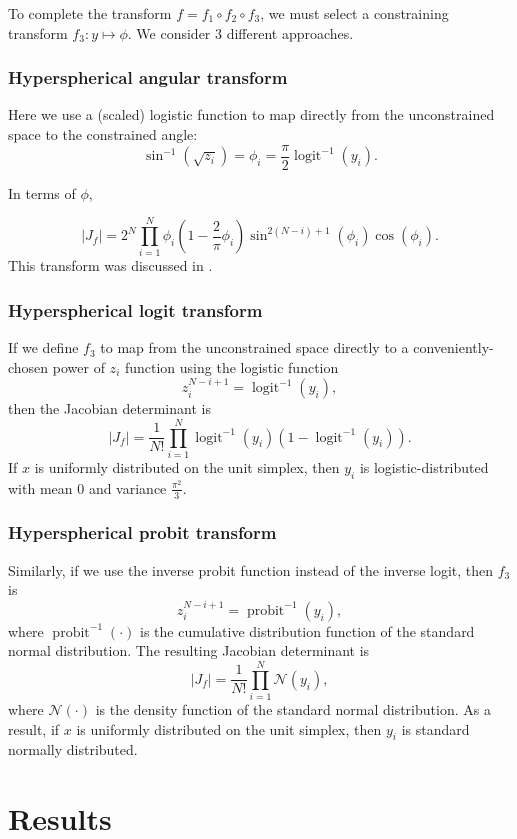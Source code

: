 \documentclass[11pt]{article}
\begin{document}
To complete the transform $f = f_1 \circ f_2 \circ f_3$, we must select a constraining transform $f_3: y \mapsto \phi$.
We consider 3 different approaches.

\subsubsection{Hyperspherical angular transform}

Here we use a (scaled) logistic function to map directly from the unconstrained space to the constrained angle:
$$\sin^{-1}(\sqrt{z_i}) = \phi_i = \frac{\pi}{2} \operatorname{logit}^{-1} (y_i).$$

In terms of $\phi$,

$$
|J_f| = 2^N \prod_{i=1}^N \phi_i \left(1 - \frac{2}{\pi} \phi_i\right) \sin^{2(N-i)+1}(\phi_i) \cos(\phi_i).
$$
This transform was discussed in \cite{betancourt2012cruising}.

\subsubsection{Hyperspherical logit transform}

If we define $f_3$ to map from the unconstrained space directly to a conveniently-chosen power of $z_i$ function using the logistic function 
$$z_i^{N-i+1} = \operatorname{logit}^{-1} (y_i),$$
then the Jacobian determinant is
$$
|J_f| = \frac{1}{N!} \prod_{i=1}^N \operatorname{logit}^{-1}(y_i) (1 - \operatorname{logit}^{-1}(y_i)).
$$
If $x$ is uniformly distributed on the unit simplex, then $y_i$ is logistic-distributed with mean 0 and variance $\frac{\pi^2}{3}$.

\subsubsection{Hyperspherical probit transform}

Similarly, if we use the inverse probit function instead of the inverse logit, then $f_3$ is
$$z_i^{N-i+1} = \operatorname{probit}^{-1} (y_i),$$
where $\operatorname{probit}^{-1}(\cdot)$ is the cumulative distribution function of the standard normal distribution.
The resulting Jacobian determinant is
\[
|J_f| = \frac{1}{N!} \prod_{i=1}^N \mathcal{N}(y_i),
\]
where $\mathcal{N}(\cdot)$ is the density function of the standard normal distribution.
As a result, if $x$ is uniformly distributed on the unit simplex, then $y_i$ is standard normally distributed.

\section{Results}
\end{document}
